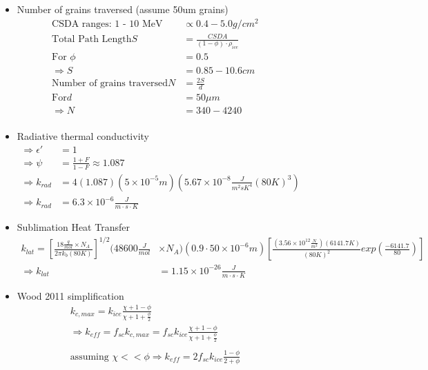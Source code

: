 \documentclass[11pt]{article} %
\begin{document}
\begin{figure}[ht]
\begin{Table}
\begin{Comment}
\begin{itemize}
\item Number of grains traversed (assume 50um grains)
	\begin{equation}
	\begin{split}
	\text{CSDA ranges: 1 - 10 MeV} &\varpropto 0.4 - 5.0 g/cm^{2} \\
	\text{Total Path Length} S &= \frac{CSDA}{(1-\phi)\cdot\rho_{ice}} \\
	\text{For } \phi &= 0.5 \\
	\Rightarrow S &= 0.85 - 10.6 cm \\
	\text{Number of grains traversed} N &= \frac{2S}{d} \\
	\text{For} d &= 50 \mu m \\
	\Rightarrow N &= 340 - 4240 \\
	\end{split}
	\end{equation}

\item Radiative thermal conductivity
	\begin{equation}
	\begin{split}
	\Rightarrow \epsilon' &= 1 \\
	\Rightarrow \psi &= \frac{1+F}{1-F} \approx 1.087 \\
	\Rightarrow k_{rad} &= 4 (1.087)(5\times10^{-5} m)(5.67\times10^{-8} \frac{J}{m^{2} s K^{4}}(80 K)^{3}) \\
	\Rightarrow k_{rad} &= 6.3\times10^{-6} \frac{J}{m \cdot s \cdot K}
	\end{split}
	\end{equation}

\item Sublimation Heat Transfer
	\begin{equation}
	\begin{split}
	k_{lat} = [ \frac{18 \frac{g}{mol} \times N_{A}}{2 \pi k_{b} (80K)} ]^{1/2} (48600 \frac{J}{mol} & \times N_{A})(0.9 \cdot 50\times10^{-6} m) [ \frac{(3.56\times 10^{12} \frac{N}{m^{2}})(6141.7 K)}{(80 K)^{2}} exp( \frac{-6141.7}{80} ) ] \\
	\Rightarrow k_{lat} &= 1.15\times10^{-26}\frac{J}{m \cdot s \cdot K}
	\end{split}
	\end{equation}

\item Wood 2011 simplification
	\begin{equation}
	\begin{gathered}
	k_{c,max} = k_{ice} \frac{\chi + 1 - \phi}{\chi + 1 + \frac{\phi}{2}} \\
	\Rightarrow k_{eff} = f_{sc} k_{c,max} = f_{sc} k_{ice} \frac{\chi + 1 - \phi}{\chi + 1 + \frac{\phi}{2}} \\
	\\
	\text{assuming   } \chi << \phi  \Rightarrow k_{eff}=2 f_{sc} k_{ice} \frac{1-\phi}{2+\phi}
	\end{gathered}
	\end{equation}
	

\end{itemize}
\end{Comment}
\end{Table}
\end{figure}
\end{document}
